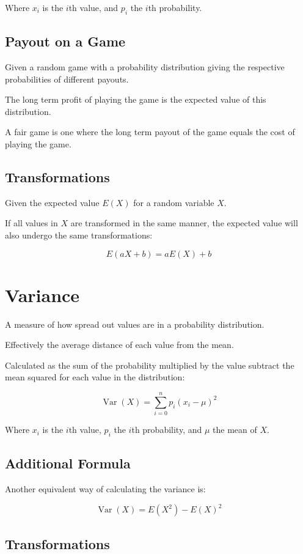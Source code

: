 \documentclass[a4paper,11pt]{article}
\DeclareMathOperator\Var{Var}
\begin{document}
Where $x_i$ is the $i$th value, and $p_i$ the $i$th probability.


\subsection{Payout on a Game}

Given a random game with a probability distribution giving the respective
probabilities of different payouts.

The long term profit of playing the game is the expected value of this
distribution.

A fair game is one where the long term payout of the game equals the cost of
playing the game.


\subsection{Transformations}

Given the expected value $E(X)$ for a random variable $X$.

If all values in $X$ are transformed in the same manner, the expected value
will also undergo the same transformations:

$$
E(aX + b) = aE(X) + b
$$




\section{Variance}

A measure of how spread out values are in a probability distribution.

Effectively the average distance of each value from the mean.

Calculated as the sum of the probability multiplied by the value subtract the
mean squared for each value in the distribution:

$$
\Var(X) = \sum^{n}_{i = 0} p_i (x_i - \mu)^2
$$

Where $x_i$ is the $i$th value, $p_i$ the $i$th probability, and $\mu$ the mean
of $X$.


\subsection{Additional Formula}

Another equivalent way of calculating the variance is:

$$
\Var(X) = E(X^2) - E(X)^2
$$


\subsection{Transformations}
\end{document}
